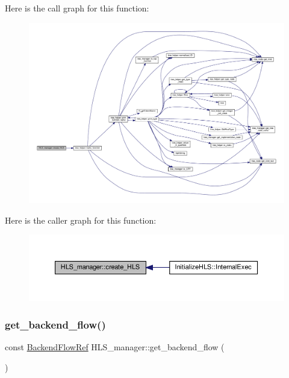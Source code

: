 Here is the call graph for this function\+:
\nopagebreak
\begin{figure}[H]
\begin{center}
\leavevmode
\includegraphics[width=350pt]{dc/dd7/classHLS__manager_a0b8d2323f8e04cfe68b27e5ec8c4566c_cgraph}
\end{center}
\end{figure}
Here is the caller graph for this function\+:
\nopagebreak
\begin{figure}[H]
\begin{center}
\leavevmode
\includegraphics[width=350pt]{dc/dd7/classHLS__manager_a0b8d2323f8e04cfe68b27e5ec8c4566c_icgraph}
\end{center}
\end{figure}
\mbox{\label{classHLS__manager_aff13fa7f6ea495bbb5979294d336edb5}} 
\subsubsection{\texorpdfstring{get\+\_\+backend\+\_\+flow()}{get\_backend\_flow()}}
{\footnotesize\ttfamily const \hyperlink{BackendFlow_8hpp_addb01ef393ed4ea8a79765c8ebfcf5a0}{Backend\+Flow\+Ref} H\+L\+S\+\_\+manager\+::get\+\_\+backend\+\_\+flow (\begin{DoxyParamCaption}{ }\end{DoxyParamCaption})}



